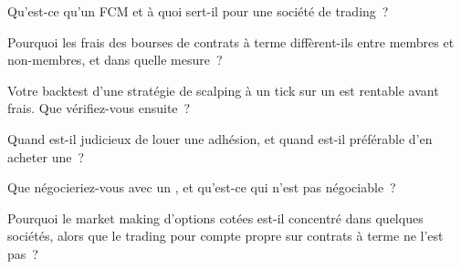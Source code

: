 \begin{interviewq}\label{iq:m1:getting-access-futures-options:1}
Qu'est-ce qu'un FCM et à quoi sert-il pour une société de trading~?
\end{interviewq}

\begin{interviewq}\label{iq:m1:getting-access-futures-options:2}
Pourquoi les frais des bourses de contrats à terme diffèrent-ils entre membres et non-membres, et
dans quelle mesure~?
\end{interviewq}

\begin{interviewq}\label{iq:m1:getting-access-futures-options:3}
Votre backtest d'une stratégie de scalping à un tick sur un  est
rentable avant frais. Que vérifiez-vous ensuite~?
\end{interviewq}

\begin{interviewq}\label{iq:m1:getting-access-futures-options:4}
Quand est-il judicieux de louer une adhésion, et quand est-il préférable d'en acheter une~?
\end{interviewq}

\begin{interviewq}\label{iq:m1:getting-access-futures-options:5}
Que négocieriez-vous avec un , et qu'est-ce qui
n'est pas négociable~?
\end{interviewq}

\begin{interviewq}\label{iq:m1:getting-access-futures-options:6}
Pourquoi le market making d'options cotées est-il concentré dans quelques sociétés, alors que
le trading pour compte propre sur contrats à terme ne l'est pas~?
\end{interviewq}
